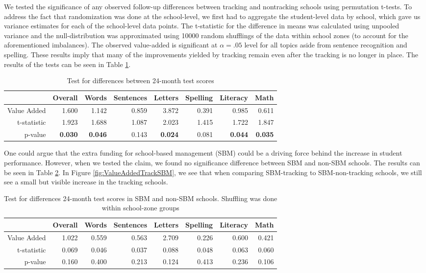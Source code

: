 \documentclass[11pt]{article}
\begin{document}
We tested the significance of any observed follow-up differences between tracking and nontracking schools using permutation t-tests. To address the fact that randomization was done at the school-level, we first had to aggregate the student-level data by school, which gave us variance estimates for each of the school-level data points.  The t-statistic for the difference in means was calculated using unpooled variance and the null-distribution was approximated using 10000 random shufflings of the data within school zones (to account for the aforementioned imbalances).  The observed value-added is significant at $ \alpha = .05 $ level for all topics aside from sentence recognition and spelling. These results imply that many of the improvements yielded by tracking remain even after the tracking is no longer in place. The results of the tests can be seen in Table \ref{tab:tracking_va}.

\begin{table}[ht]
	\centering
	\begin{tabular}{rrrrrrrr}
		\hline
		& Overall & Words & Sentences & Letters & Spelling & Literacy & Math \\ 
		\hline
		Value Added & 1.600 & 1.142 & 0.859 & 3.872 & 0.391 & 0.985 & 0.611 \\ 
		t-statistic & 1.923 & 1.688 & 1.087 & 2.023 & 1.415 & 1.722 & 1.847 \\ 
		p-value & {\bf 0.030} & {\bf 0.046} & 0.143 & {\bf 0.024} & 0.081 & {\bf 0.044} & {\bf 0.035 }\\ 
		\hline
	\end{tabular}
	\caption{Test for differences between 24-month test scores} 
		\label{tab:tracking_va}
\end{table}

One could argue that the extra funding for school-based management (SBM) could be a driving force behind the increase in student performance.  However, when we tested the claim, we found no significance difference between SBM and non-SBM schools.  The results can be seen in Table \ref{tab:sbm}.  In Figure \ref{fig:ValueAddedTrackSBM}, we see that when comparing SBM-tracking to SBM-non-tracking schools, we still see a small but visible increase in the tracking schools.

\begin{table}[ht]
	\centering
	\begin{tabular}{rrrrrrrr}
		\hline
		& Overall & Words & Sentences & Letters & Spelling & Literacy & Math \\ 
		\hline
		Value Added & 1.022 & 0.559 & 0.563 & 2.709 & 0.226 & 0.600 & 0.421 \\ 
		t-statistic & 0.069 & 0.046 & 0.037 & 0.088 & 0.048 & 0.063 & 0.060 \\ 
		p-value & 0.160 & 0.400 & 0.213 & 0.124 & 0.413 & 0.236 & 0.106 \\ 
		\hline
	\end{tabular}
	\caption{Test for differences 24-month test scores in SBM and non-SBM schools.  
		Shuffling was done within school-zone groups} 
	\label{tab:sbm}
\end{table}
\end{document}
